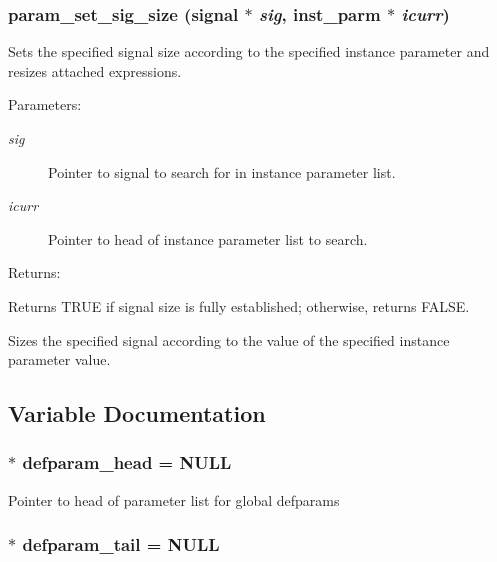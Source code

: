 \subsubsection{ param\_\-set\_\-sig\_\-size ({\bf signal} $\ast$ {\em sig}, {\bf inst\_\-parm} $\ast$ {\em icurr})}\label{param_8c_a13}


Sets the specified signal size according to the specified instance parameter and resizes attached expressions.

\begin{Desc}
\item[Parameters: ]\par
\begin{description}
\item[{\em 
sig}]Pointer to signal to search for in instance parameter list. \item[{\em 
icurr}]Pointer to head of instance parameter list to search.\end{description}
\end{Desc}
\begin{Desc}
\item[Returns: ]\par
Returns TRUE if signal size is fully established; otherwise, returns FALSE.\end{Desc}
Sizes the specified signal according to the value of the specified instance parameter value. 

\subsection{Variable Documentation}
\subsubsection{$\ast$ defparam\_\-head = NULL}\label{param_8c_a0}


Pointer to head of parameter list for global defparams 
\subsubsection{$\ast$ defparam\_\-tail = NULL}\label{param_8c_a1}


